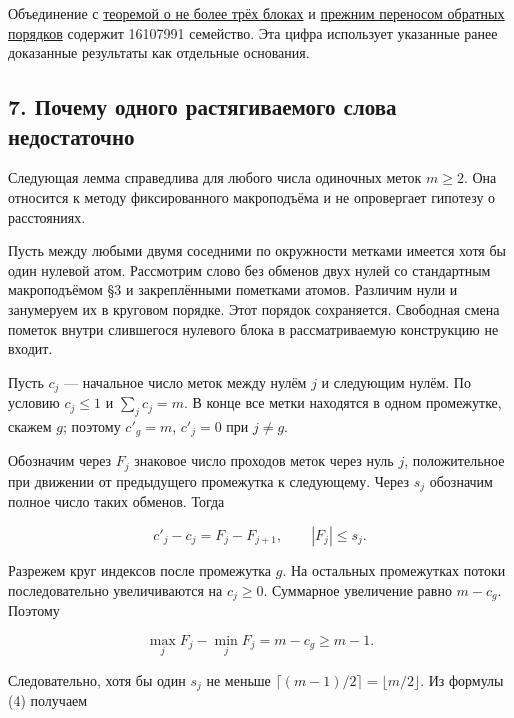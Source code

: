 \documentclass[
  11pt,
  a4paper,
]{article}
\begin{document}
Объединение с \href{LRX_MULTISET_THREE_BLOCK_M8_THEOREM_RU.md}{теоремой
о не более трёх блоках} и
\href{LRX_MULTISET_COMPARISON_TRANSFER_RU.md}{прежним переносом обратных
порядков} содержит 16107991 семейство. Эта цифра использует указанные
ранее доказанные результаты как отдельные основания.

\hypertarget{ux43fux43eux447ux435ux43cux443-ux43eux434ux43dux43eux433ux43e-ux440ux430ux441ux442ux44fux433ux438ux432ux430ux435ux43cux43eux433ux43e-ux441ux43bux43eux432ux430-ux43dux435ux434ux43eux441ux442ux430ux442ux43eux447ux43dux43e}{%
\subsection{7. Почему одного растягиваемого слова
недостаточно}\label{ux43fux43eux447ux435ux43cux443-ux43eux434ux43dux43eux433ux43e-ux440ux430ux441ux442ux44fux433ux438ux432ux430ux435ux43cux43eux433ux43e-ux441ux43bux43eux432ux430-ux43dux435ux434ux43eux441ux442ux430ux442ux43eux447ux43dux43e}}

Следующая лемма справедлива для любого числа одиночных меток \(m\ge2\).
Она относится к методу фиксированного макроподъёма и не опровергает
гипотезу о расстояниях.

Пусть между любыми двумя соседними по окружности метками имеется хотя бы
один нулевой атом. Рассмотрим слово без обменов двух нулей со
стандартным макроподъёмом §3 и закреплёнными пометками атомов. Различим
нули и занумеруем их в круговом порядке. Этот порядок сохраняется.
Свободная смена пометок внутри слившегося нулевого блока в
рассматриваемую конструкцию не входит.

Пусть \(c_j\) --- начальное число меток между нулём \(j\) и следующим
нулём. По условию \(c_j\le1\) и \(\sum_jc_j=m\). В конце все метки
находятся в одном промежутке, скажем \(g\); поэтому \(c'_g=m\),
\(c'_j=0\) при \(j\ne g\).

Обозначим через \(F_j\) знаковое число проходов меток через нуль \(j\),
положительное при движении от предыдущего промежутка к следующему. Через
\(s_j\) обозначим полное число таких обменов. Тогда

\[c'_j-c_j=F_j-F_{j+1},\qquad |F_j|\le s_j.\tag{14}\]

Разрежем круг индексов после промежутка \(g\). На остальных промежутках
потоки последовательно увеличиваются на \(c_j\ge0\). Суммарное
увеличение равно \(m-c_g\). Поэтому

\[\max_jF_j-\min_jF_j=m-c_g\ge m-1.\tag{15}\]

Следовательно, хотя бы один \(s_j\) не меньше
\(\lceil(m-1)/2\rceil=\lfloor m/2\rfloor\). Из формулы (4) получаем
\end{document}
